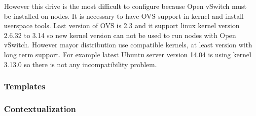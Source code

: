 However this drive is the most difficult to configure because Open vSwitch must be installed on nodes. It is necessary to have \Ac{OVS} support in kernel and install userspace tools. Last version of \Ac{OVS} is 2.3 and it support linux kernel version 2.6.32 to 3.14 so new kernel version can not be used to run nodes with Open vSwitch. However mayor distribution use compatible kernels, at least version with long term support. For example latest Ubuntu server version 14.04 is using kernel 3.13.0 so there is not any incompatibility problem.

\subsubsection{Templates}
\subsubsection{Contextualization}
